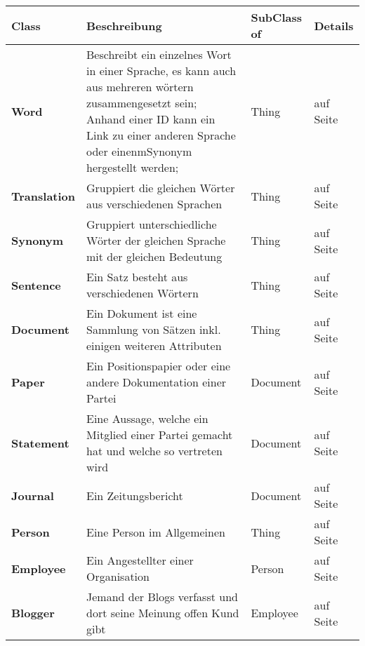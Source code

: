\documentclass[
    11pt,
    latin1,
    a4paper,
    oneside
]{scrreprt}
\begin{document}
\begin{table}[h]
	\centering
	\begin{tabular}{ | l | p{4cm} | l | l| }
		\hline
		\textbf{Class} & \textbf{Beschreibung} & \textbf{SubClass of} & \textbf{Details} \\ \hline
		\textbf{Word} & Beschreibt ein einzelnes Wort in einer Sprache, es kann auch aus mehreren w\"ortern zusammengesetzt sein; Anhand einer ID kann ein Link zu einer anderen Sprache oder einenmSynonym hergestellt werden; & Thing & \nameref{sec:class_word} auf Seite \pageref{sec:class_word} \\ \hline
		\textbf{Translation} & Gruppiert die gleichen W\"orter aus verschiedenen Sprachen & Thing & \nameref{sec:class_translation} auf Seite \pageref{sec:class_translation} \\ \hline
		\textbf{Synonym} & Gruppiert unterschiedliche W\"orter der gleichen Sprache mit der gleichen Bedeutung & Thing & \nameref{sec:class_synonym} auf Seite \pageref{sec:class_synonym} \\ \hline
		\textbf{Sentence} & Ein Satz besteht aus verschiedenen W\"ortern & Thing & \nameref{sec:class_sentence} auf Seite \pageref{sec:class_sentence} \\ \hline
		\textbf{Document} & Ein Dokument ist eine Sammlung von S\"atzen inkl. einigen weiteren Attributen & Thing & \nameref{sec:class_document} auf Seite \pageref{sec:class_document} \\ \hline
		\textbf{Paper} & Ein Positionspapier oder eine andere Dokumentation einer Partei & Document & \nameref{sec:class_paper} auf Seite \pageref{sec:class_paper} \\ \hline
		\textbf{Statement} & Eine Aussage, welche ein Mitglied einer Partei gemacht hat und welche so vertreten wird & Document & \nameref{sec:class_statement} auf Seite \pageref{sec:class_statement} \\ \hline
		\textbf{Journal} & Ein Zeitungsbericht & Document & \nameref{sec:class_journal} auf Seite \pageref{sec:class_journal} \\ \hline
		\textbf{Person} & Eine Person im Allgemeinen & Thing & \nameref{sec:class_person} auf Seite \pageref{sec:class_person} \\ \hline
		\textbf{Employee} & Ein Angestellter einer Organisation & Person & \nameref{sec:class_employee} auf Seite \pageref{sec:class_employee} \\ \hline
		\textbf{Blogger} & Jemand der Blogs verfasst und dort seine Meinung offen Kund gibt & Employee & \nameref{sec:class_blogger} auf Seite \pageref{sec:class_blogger} \\ \hline

\end{tabular}
\end{table}
\end{document}

